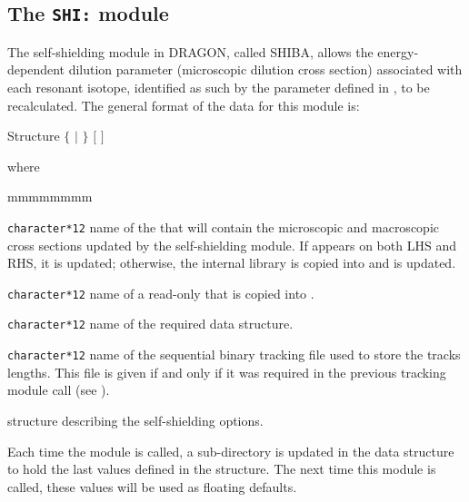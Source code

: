 \subsection{The {\tt SHI:} module}\label{sect:SHIData}

The self-shielding module in DRAGON, called SHIBA\cite{SHIBA},  allows the
energy-dependent dilution parameter (microscopic dilution cross section)
associated with each resonant isotope, identified as such by the 
parameter defined in , to be recalculated. The general format of
the data for this module is:

\begin{DataStructure}{Structure }
 \moc{:=}  $\{$  $|$  $\}$ 
 $[$  $]$ \moc{::} 
\end{DataStructure}

\noindent
where

\begin{ListeDeDescription}{mmmmmmmm}

\item[\dusa{MICLIB}] {\tt character*12} name of the  that will
contain the microscopic and macroscopic cross sections updated by the
self-shielding module. If
 appears on both LHS and RHS, it is updated; otherwise, the
internal library  is copied into
 and  is updated.

\item[\dusa{OLDLIB}] {\tt character*12} name of a read-only  
that is copied into .

\item[\dusa{TRKNAM}] {\tt character*12} name of the required 
data structure.

\item[\dusa{TRKFIL}] {\tt character*12} name of the sequential binary tracking
file used to store the tracks lengths. This file is given if and only if it was
required in the previous tracking module call (see ).

\item[\dstr{descshi}] structure describing the self-shielding options.

\end{ListeDeDescription}

Each time the  module is called, a sub-directory is updated in the
 data structure to hold the last values defined in the
 structure. The next time this module is called,
these values will be used as floating defaults.

